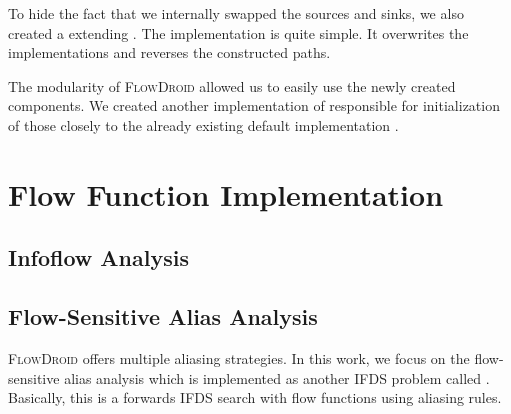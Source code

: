 \documentclass[../draft.tex]{subfiles}
\begin{document}
    To hide the fact that we internally swapped the sources and sinks, we also created a  extending . The implementation is quite simple. It overwrites the  implementations and reverses the constructed paths.

    The modularity of \textsc{FlowDroid} allowed us to easily use the newly created components. We created another implementation of  responsible for initialization of those closely to the already existing default implementation .

    \section{Flow Function Implementation}\label{s:problems}
    \subsection{Infoflow Analysis}

    \subsection{Flow-Sensitive Alias Analysis}\label{s:aliasing}
    \textsc{FlowDroid} offers multiple aliasing strategies.
    In this work, we focus on the flow-sensitive alias analysis which is implemented as another IFDS problem called . Basically, this is a forwards IFDS search with flow functions using aliasing rules. 
\end{document}
